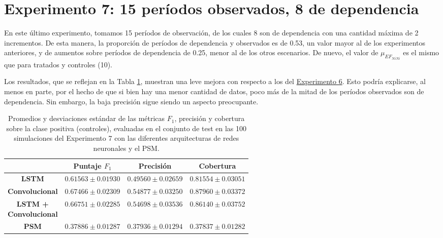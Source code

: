\documentclass[../../main.tex]{subfiles}
\begin{document}
\section{Experimento 7: 15 períodos observados, 8 de dependencia} \label{sec:exp7}
En este último experimento, tomamos 15 períodos de observación, de los cuales 8 son de
dependencia con una cantidad máxima de 2 incrementos. De esta manera, la proporción de
períodos de dependencia y observados es de 0.53, un valor mayor al de los experimentos
anteriores, y de aumentos sobre períodos de dependencia de 0.25, menor al de los otros
escenarios. De nuevo, el valor de \(\mu_{{EF}_{NiNi}}\) es el mismo que para tratados
y controles (10).

Los resultados, que se reflejan en la Tabla \ref{tab:results_exp7}, muestran una leve
mejora con respecto a los del \hyperref[sec:exp6]{Experimento 6}. Esto podría explicarse,
al menos en parte, por el hecho de que si bien hay una menor cantidad de datos, poco más
de la mitad de los períodos observados son de dependencia. Sin embargo, la baja precisión
sigue siendo un aspecto preocupante.

\begin{table}[H]
    \centering
    \renewcommand{\arraystretch}{1.2}
    \label{tab:results_exp7}
    \begin{tabular}{|c|c|c|c|}
        \hline
         & \textbf{Puntaje} \(F_1\) & \textbf{Precisión} & \textbf{Cobertura} \\ \hline\hline
        \textbf{LSTM}
            & $0.61563 \pm 0.01930$ & $0.49560 \pm 0.02659$ & $0.81554 \pm 0.03051$ \\ \hline
        \textbf{Convolucional}
            & $\mathbf{0.67466 \pm 0.02309}$ & $\mathbf{0.54877 \pm 0.03250}$ & $\mathbf{0.87960 \pm 0.03372}$ \\ \hline
        \makecell{\textbf{LSTM +} \\ \textbf{Convolucional}}
            & $0.66751 \pm 0.02285$ & $0.54698 \pm 0.03536$ & $0.86140 \pm 0.03752$ \\ \hline
        \textbf{PSM}
            & $0.37886 \pm 0.01287$ & $0.37936 \pm 0.01294$ & $0.37837 \pm 0.01282$ \\
        \hline
    \end{tabular}
    \caption{Promedios y desviaciones estándar de las métricas \(F_1\), precisión y
    cobertura sobre la clase positiva (controles), evaluadas en el conjunto de test en las
    100 simulaciones del Experimento 7 con las diferentes arquitecturas de redes
    neuronales y el PSM.}
\end{table}
\end{document}
